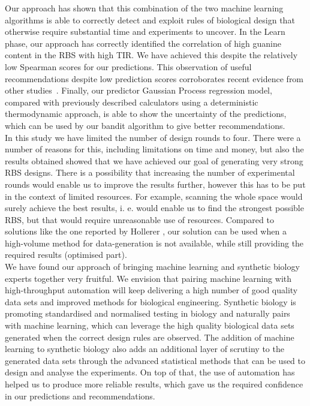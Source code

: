 \documentclass{article}
\begin{document}
Our approach has shown that this combination of the two machine learning algorithms is able to correctly detect and exploit rules of biological design that otherwise require substantial time and experiments to uncover.
In the Learn phase, our approach has correctly identified the correlation of high guanine content in the RBS with high TIR.
We have achieved this despite the relatively low Spearman scores for our predictions. This observation of useful recommendations despite low prediction scores corroborates recent evidence from other studies~\cite{Radivojevic2020, Opgenorth2019}.
Finally, our predictor Gaussian Process regression model, compared with previously described calculators using a deterministic thermodynamic approach, is able to show the uncertainty of the predictions, which can be used by our bandit algorithm to give better recommendations.\\

In this study we have limited the number of design rounds to four.
There were a number of reasons for this, including limitations on time and money, but also the results obtained showed that we have achieved our goal of generating very strong RBS designs.
There is a possibility that increasing the number of experimental rounds would enable us to improve the results further, however this has to be put in the context of limited resources.
For example, scanning the whole space would surely achieve the best results, i. e. would enable us to find the strongest possible RBS, but that would require unreasonable use of resources.
Compared to solutions like the one reported by Hollerer \cite{Hollerer2020}, our solution can be used when a high-volume method for data-generation is not available, while still providing the required results (optimised part). \\

We have found our approach of bringing machine learning and synthetic biology experts together very fruitful.
We envision that pairing machine learning with high-throughput automation will keep delivering a high number of good quality data sets and improved methods for biological engineering.
Synthetic biology is promoting standardised and normalised testing in biology and naturally pairs with machine learning, which can leverage the high quality biological data sets generated when the correct design rules are observed.
The addition of machine learning to synthetic biology also adds an additional layer of scrutiny to the generated data sets through the advanced statistical methods that can be used to design and analyse the experiments.
On top of that, the use of automation has helped us to produce more reliable results, which gave us the required confidence in our predictions and recommendations.\\
\end{document}
